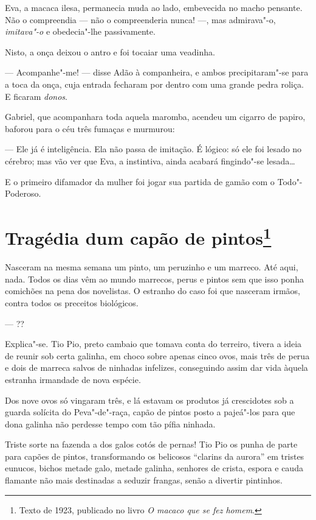 Eva, a macaca ilesa, permanecia muda ao lado, embevecida no macho
pensante. Não o compreendia --- não o compreenderia nunca! ---, mas
admirava"-o, \emph{imitava"-o} e obedecia"-lhe passivamente.

Nisto, a onça deixou o antro e foi tocaiar uma veadinha.

--- Acompanhe"-me! --- disse Adão à companheira, e ambos precipitaram"-se
para a toca da onça, cuja entrada fecharam por dentro com uma grande
pedra roliça. E ficaram \emph{donos}.

Gabriel, que acompanhara toda aquela maromba, acendeu um cigarro de
papiro, baforou para o céu três fumaças e murmurou:

--- Ele já é inteligência. Ela não passa de imitação. É lógico: só ele
foi lesado no cérebro; mas vão ver que Eva, a instintiva, ainda acabará
fingindo"-se lesada\ldots{}

E o primeiro difamador da mulher foi jogar sua partida de gamão com o
Todo"-Poderoso.

\chapter{Tragédia dum capão de pintos\footnote[*]{Texto de 1923, publicado no livro \emph{O macaco que se fez homem}.}}

Nasceram na mesma semana um pinto, um peruzinho e um marreco. Até aqui,
nada. Todos os dias vêm ao mundo marrecos, perus e pintos sem que isso
ponha comichões na pena dos novelistas. O estranho do caso foi que
nasceram irmãos, contra todos os preceitos biológicos.

--- ??

Explica"-se. Tio Pio, preto cambaio que tomava conta do terreiro, tivera
a ideia de reunir sob certa galinha, em choco sobre apenas cinco ovos,
mais três de perua e dois de marreca salvos de ninhadas infelizes,
conseguindo assim dar vida àquela estranha irmandade de nova espécie.

Dos nove ovos só vingaram três, e lá estavam os produtos já crescidotes
sob a guarda solícita do Peva"-de"-raça, capão de pintos posto a pajeá"-los
para que dona galinha não perdesse tempo com tão pífia ninhada.

Triste sorte na fazenda a dos galos cotós de pernas! Tio Pio os punha de
parte para capões de pintos, transformando os belicosos ``clarins da
aurora'' em tristes eunucos, bichos metade galo, metade galinha,
senhores de crista, espora e cauda flamante não mais destinadas a
seduzir frangas, senão a divertir pintinhos.

